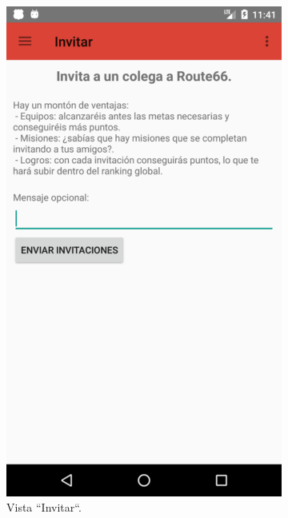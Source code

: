\documentclass[twoside]{report}
\begin{document}
\begin{figure}[H]
\begin{center}
	\begin{subfigure}[t]{.3\linewidth}
		\includegraphics[scale=0.2]{images/userguide/11.png}
		\caption{Vista “Invitar“.}
	\end{subfigure}\hspace{2mm}%
	\begin{subfigure}[t]{.3\linewidth}

\end{subfigure}
\end{center}
\end{figure}
\end{document}
